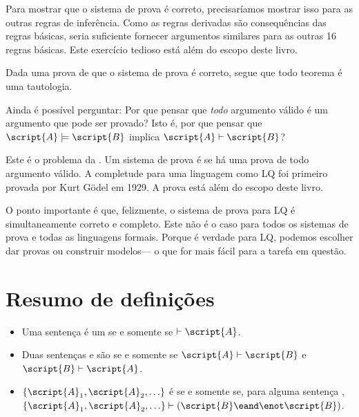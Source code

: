 Para mostrar que o sistema de prova é correto, precisaríamos mostrar isso para as outras regras de inferência. Como as regras derivadas são consequências das regras básicas, seria suficiente fornecer argumentos similares para as outras 16 regras básicas. Este exercício tedioso está além do escopo deste livro.

Dada uma prova de que o sistema de prova é correto, segue que todo teorema é uma tautologia.

Ainda é possível perguntar: Por que pensar que \emph{todo} argumento válido é um argumento que pode ser provado?  Isto é, por que pensar que $\script{A}\models\script{B}$ implica $\script{A}\vdash\script{B}$?

Este é o problema da . Um sistema de prova é  se há uma prova de todo argumento válido. A completude para uma linguagem como LQ foi primeiro provada por Kurt G\"odel em 1929. A prova está além do escopo deste livro.

O ponto importante é que, felizmente, o sistema de prova para LQ é simultaneamente correto e completo. Este não é o caso para todos os sistemas de prova e todas as linguagens formais. Porque é verdade para LQ, podemos escolher dar provas ou construir modelos--- o que for mais fácil para a tarefa em questão.




\section*{Resumo de definições}
\begin{itemize}
\item Uma sentença  é um  se e somente se $\vdash\script{A}$.

\item Duas sentenças  e  são  se e somente se $\script{A}\vdash\script{B}$ e $\script{B}\vdash\script{A}$.

\item $\{\script{A}_1,\script{A}_2,\ldots\}$ é  se e somente se, para alguma sentença , $\{\script{A}_1,\script{A}_2,\ldots\}\vdash(\script{B} \eand \enot \script{B})$.
\end{itemize}



\practiceproblems

